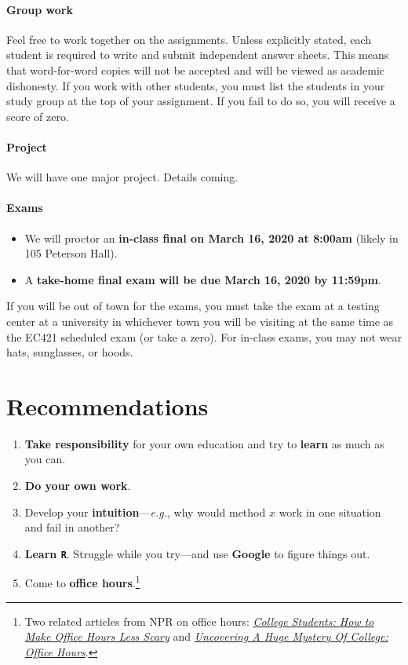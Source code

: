 \documentclass[10pt]{article}
\newcommand{\emf}[1]{\textbf{\textcolor{grass_green}{#1}}}
\begin{document}
\paragraph{Group work} Feel free to work together on the assignments. Unless explicitly stated, each student is required to write and submit independent answer sheets. This means that word-for-word copies will not be accepted and will be viewed as academic dishonesty. If you work with other students, you must list the students in your study group at the top of your assignment. If you fail to do so, you will receive a score of zero.

\paragraph{Project} We will have one major project. Details coming.

\paragraph{Exams}
\begin{itemize}
  \item We will proctor an \emf{in-class final on March 16, 2020 at 8:00am} (likely in 105 Peterson Hall).
  \item A \emf{take-home final exam will be due March 16, 2020 by 11:59pm}.
\end{itemize}
If you will be out of town for the exams, you must take the exam at a testing center at a university in whichever town you will be visiting at the same time as the EC421 scheduled exam (or take a zero). For in-class exams, you may not wear hats, sunglasses, or hoods.

\section*{Recommendations}

\begin{enumerate}
  \item \emf{Take responsibility} for your own education and try to \emf{learn} as much as you can.
  \item \emf{Do your own work}.
  \item Develop your \emf{intuition}---\textit{e.g.}, why would method $x$ work in one situation and fail in another?
  \item \emf{Learn \texttt{R}}. Struggle while you try---and use \emf{Google} to figure things out.
  \item Come to \emf{office hours}.\footnote{Two related articles from NPR on office hours: \href{https://www.npr.org/2019/10/05/678815966/college-students-how-to-make-office-hours-less-scary}{\textit{College Students: How to Make Office Hours Less Scary}} and \href{https://www.npr.org/2019/10/02/766568824/uncovering-a-huge-mystery-of-college-office-hours}{\textit{Uncovering A Huge Mystery Of College: Office Hours}}.}
\end{enumerate}
\end{document}
